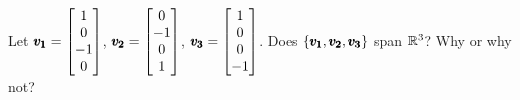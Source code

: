 \documentclass{../mathhomework}
\newenvironment{Mat}{\begin{bmatrix}}{\end{bmatrix}}
\begin{document}
\pagebreak
\begin{problem}[1.4\#21]
    Let $\Vect{v_1} = \begin{Mat}
        1 \\ 0 \\ -1 \\ 0
    \end{Mat}$, $\Vect{v_2} = \begin{Mat}
        0 \\ -1 \\ 0 \\ 1
    \end{Mat}$, $\Vect{v_3} = \begin{Mat}
        1 \\ 0 \\ 0 \\ -1
    \end{Mat}$. Does $\{\pmb{v_1}, \pmb{v_2}, \pmb{v_3}\}$ span $\mathbb{R}^3$? Why or why not?


\end{problem}
\end{document}
